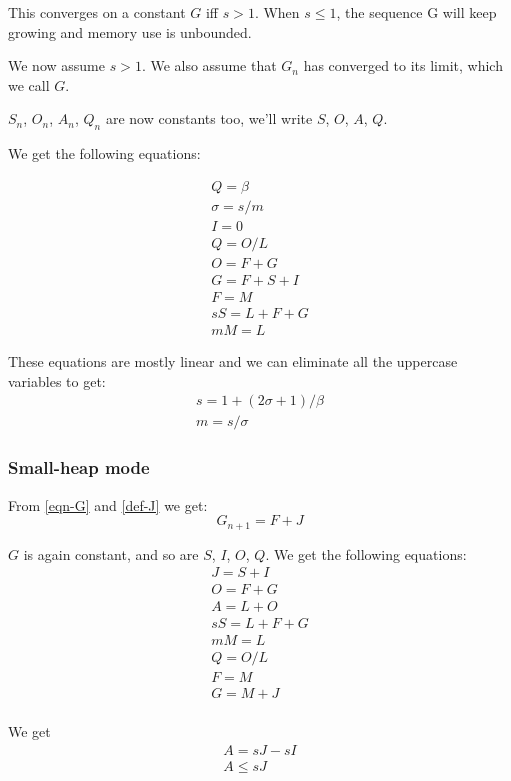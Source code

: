\documentclass{article}
\begin{document}
This converges on a constant $G$ iff $s > 1$. When $s \leq 1$, the
sequence G will keep growing and memory use is unbounded.

We now assume $s > 1$. We also assume that $G_n$ has converged to its
limit, which we call $G$.

$S_n$, $O_n$, $A_n$, $Q_n$ are now constants too, we'll write $S$,
$O$, $A$, $Q$.

We get the following equations:

\begin{gather*}
Q = \beta      \\
\sigma = s/m   \\
I = 0          \\
Q = O / L      \\
O = F + G      \\
G = F + S + I  \\
F = M          \\
sS = L + F + G \\
mM = L
\end{gather*}

These equations are mostly linear and we can eliminate all the
uppercase variables to get:
\begin{gather*}
s = 1 + (2\sigma + 1)/\beta \\
m = s/\sigma
\end{gather*}

\subsubsection{Small-heap mode}
From \eqref{eqn-G} and \eqref{def-J} we get:
\begin{equation}
G_{n+1} = F + J
\end{equation}

$G$ is again constant, and so are $S$, $I$, $O$, $Q$. We get the
following equations:
\begin{gather*}
J = S + I      \\
O = F + G      \\
A = L + O      \\
sS = L + F + G \\
mM = L \\
Q = O/L \\
F = M \\
G = M + J \\
\end{gather*}

We get
\begin{gather*}
A = sJ - sI \\
A \leq sJ
\end{gather*}
\end{document}
